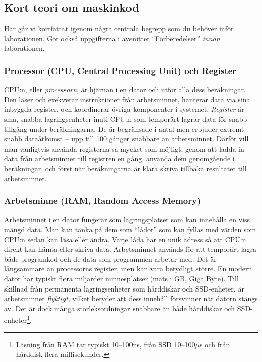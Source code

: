 \label{subsec:machinecodetheory}
\subsection{Kort teori om maskinkod}
Här går vi kortfattat igenom några centrala begrepp som du behöver inför laborationen. Gör också uppgifterna i avsnittet \enquote{Förberedelser} \emph{innan} laborationen.

\subsubsection{Processor (CPU, Central Processing Unit) och Register}
CPU:n, eller \emph{processorn}, är hjärnan i en dator och utför alla dess beräkningar. Den läser och exekverar instruktioner från arbetsminnet, hanterar data via sina inbyggda register, och koordinerar övriga komponenter i systemet. \emph{Register} är små, snabba lagringsenheter inuti CPU:n som temporärt lagrar data för snabb tillgång under beräkningarna. De är begränsade i antal men erbjuder extremt snabb dataåtkomst -- upp till 100 gånger snabbare än arbetsminnet. Därför vill man vanligtvis använda registerna så mycket som möjligt, genom att ladda in data från arbetsminnet till registren en gång, använda dem genomgående i beräkningar, och först när beräkningarna är klara skriva tillbaka resultatet till arbetsminnet.

\subsubsection{Arbetsminne (RAM, Random Access Memory)}
Arbetsminnet i en dator fungerar som lagringsplatser som kan innehålla en viss mängd data. Man kan tänka på dem som \enquote{lådor} som kan fyllas med värden som CPU:n sedan kan läsa eller ändra. Varje låda har en unik adress så att CPU:n direkt kan hämta eller skriva data.
Arbetsminnet används för att temporärt lagra både programkod och de data som programmen arbetar med.
Det är långsammare än processorns register, men kan vara betydligt större. En modern dator har typiskt flera miljarder minnesplatser (mäts i GB, Giga Byte). 
Till skillnad från permanenta lagringsenheter som hårddiskar och SSD-enheter, är arbetsminnet \emph{flyktigt}, vilket betyder att dess innehåll försvinner när datorn stängs av. Det är dock många storleksordningar snabbare än både hårddiskar och SSD-enheter\footnote{Läsning från RAM tar typiskt 10--100ns, från SSD 10--100$\mu$s och från hårddisk flera millisekunder.}.


